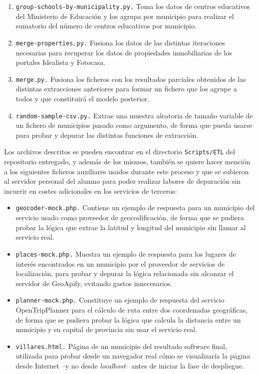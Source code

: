 \begin{enumerate}
    \item \texttt{group-schools-by-municipality.py.} Toma los datos de centros educativos del Ministerio de Educación y los agrupa por municipio para realizar el sumatorio del número de centros educativos por municipio.
    
    
    \item \texttt{merge-properties.py.} Fusiona los datos de las distintas iteraciones necesarias para recuperar los datos de propiedades inmobiliarias de los portales Idealista y Fotocasa.
    
    \item \texttt{merge.py.} Fusiona los ficheros con los resultados parciales obtenidos de las distintas extracciones anteriores para formar un fichero que los agrupe a todos y que constituirá el modelo posterior.
    
    \item \texttt{random-sample-csv.py.} Extrae una muestra aleatoria de tamaño variable de un fichero de municipios pasado como argumento, de forma que pueda usarse para probar y depurar las distintas funciones de extracción.
\end{enumerate}

Los archivos descritos se pueden encontrar en el directorio \texttt{Scripts/ETL} del repositorio entregado, y además de los mismos, también se quiere hacer mención a los siguientes ficheros auxiliares usados durante este proceso y que se subieron al servidor personal del alumno para poder realizar labores de depuración sin incurrir en costes adicionales en los servicios de terceros:

\begin{itemize}
    \item \texttt{geocoder-mock.php.} Contiene un ejemplo de respuesta para un municipio del servicio usado como proveedor de geocodificación, de forma que se pudiera probar la lógica que extrae la latitud y longitud del municipio sin llamar al servicio real.
    \item \texttt{places-mock.php.} Muestra un ejemplo de respuesta para los lugares de interés encontrados en un municipio por el proveedor de servicios de localización, para probar y depurar la lógica relacionada sin alcanzar el servidor de GeoApify, evitando gastos innecesarios.
    \item \texttt{planner-mock.php.} Constituye un ejemplo de respuesta del servicio OpenTripPlanner para el cálculo de ruta entre dos coordenadas geográficas, de forma que se pudiera probar la lógica que calcula la distancia entre un municipio y su capital de provincia sin usar el servicio real.
    \item \texttt{villares.html.} Página de un municipio del resultado software final, utilizada para probar desde un navegador real cómo se visualizaría la página desde Internet –y no desde \textit{localhost}– antes de iniciar la fase de despliegue.
\end{itemize}

